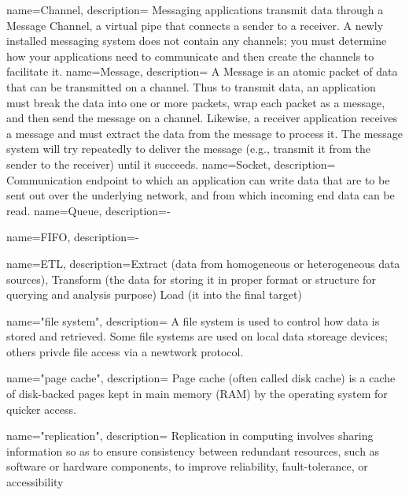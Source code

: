 {
    name=Channel,
    description={
        Messaging applications transmit data through a Message Channel, a virtual
        pipe that connects a sender to a receiver. A newly installed messaging
        system does not contain any channels; you must determine how your
        applications need to communicate and then create the channels to facilitate
        it.
    }
}
{
    name=Message,
    description={
        A Message is an atomic packet of data that can be transmitted on a
        channel. Thus to transmit data, an application must break the data into
        one or more packets, wrap each packet as a message, and then send the
        message on a channel. Likewise, a receiver application receives a
        message and must extract the data from the message to process it. The
        message system will try repeatedly to deliver the message (e.g.,
        transmit it from the sender to the receiver) until it succeeds.
    }
}
{
    name=Socket,
    description={
        Communication endpoint to which an application can write data
        that are to be sent out over the underlying network, and from which incoming end
        data can be read. \cite{TAN06}
    }
}
{
    name=Queue,
    description={-}
}


{
    name=FIFO,
    description={-}
}

{
    name=ETL,
    description={Extract (data from homogeneous or heterogeneous data sources), 
         Transform (the data for storing it in proper format or structure
         for querying and analysis purpose)
         Load (it into the final target)
    }
}

{
    name="file system",
    description={
        A file system is used to control how data is stored and retrieved. Some
        file systems are used on local data storeage devices; others privde file
        access via a newtwork protocol.
    }
}

{
    name="page cache",
    description={
        Page cache (often called disk cache) is a cache of disk-backed pages
        kept in main memory (RAM) by the operating system for quicker access.
    }
}

{
    name="replication",
    description={
        Replication in computing involves sharing information so as to ensure
        consistency between redundant resources, such as software or hardware
        components, to improve reliability, fault-tolerance, or accessibility
     }
}
